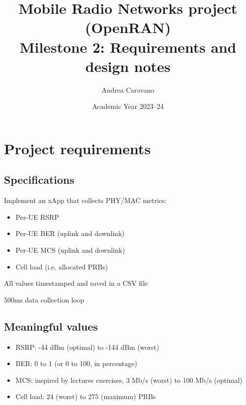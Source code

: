 \documentclass[a4paper,11pt]{article} %
\begin{document}
    \pagestyle{fancy}
    \fancyhead{}\fancyfoot{}
    \fancyfoot[C]{\thepage}

    \title{\textbf{Mobile Radio Networks project (OpenRAN)}\\Milestone 2: Requirements and design notes}
    \author{Andrea Caravano}
    \date{Academic Year 2023--24}
    \maketitle


    \section{Project requirements}\label{sec:project-requirements}

    \subsection{Specifications}\label{subsec:specifications}

    Implement an xApp that collects PHY/MAC metrics:

    \begin{itemize}
        \item Per-UE RSRP
        \item Per-UE BER (uplink and downlink)
        \item Per-UE MCS (uplink and downlink)
        \item Cell load (i.e. allocated PRBs)
    \end{itemize}

    All values timestamped and saved in a CSV file

    500ms data collection loop

    \subsection{Meaningful values}\label{subsec:meaningful-values}

    \begin{itemize}
        \item RSRP: -44 dBm (optimal) to -144 dBm (worst)
        \item BER: 0 to 1 (or 0 to 100, in percentage)
        \item MCS: inspired by lectures exercises, 3 Mb/s (worst) to 100 Mb/s (optimal)
        \item Cell load: 24 (worst) to 275 (maximum) PRBs
    \end{itemize}
\end{document}
